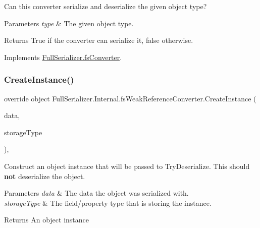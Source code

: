 Can this converter serialize and deserialize the given object type? 


\begin{DoxyParams}{Parameters}
{\em type} & The given object type.\\
\hline
\end{DoxyParams}
\begin{DoxyReturn}{Returns}
True if the converter can serialize it, false otherwise.
\end{DoxyReturn}


Implements \hyperlink{class_full_serializer_1_1fs_converter_a6d9e084c5e7f646a8d220705efaecb35}{Full\+Serializer.\+fs\+Converter}.

\mbox{\label{class_full_serializer_1_1_internal_1_1fs_weak_reference_converter_a8732fca2359367dbf78c687898625406}} 
\subsubsection{\texorpdfstring{Create\+Instance()}{CreateInstance()}}
{\footnotesize\ttfamily override object Full\+Serializer.\+Internal.\+fs\+Weak\+Reference\+Converter.\+Create\+Instance (\begin{DoxyParamCaption}\item[{\hyperlink{class_full_serializer_1_1fs_data}{fs\+Data}}]{data,  }\item[{Type}]{storage\+Type }\end{DoxyParamCaption})\hspace{0.3cm}{\ttfamily [inline]}, {\ttfamily [virtual]}}



Construct an object instance that will be passed to Try\+Deserialize. This should {\bfseries not} deserialize the object. 


\begin{DoxyParams}{Parameters}
{\em data} & The data the object was serialized with.\\
\hline
{\em storage\+Type} & The field/property type that is storing the instance.\\
\hline
\end{DoxyParams}
\begin{DoxyReturn}{Returns}
An object instance
\end{DoxyReturn}


